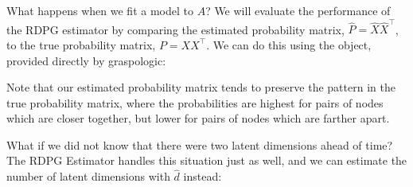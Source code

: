 \documentclass[letterpaper,10pt,english]{jupyterBook}
\begin{document}
\noindent{}

\sphinxAtStartPar
What happens when we fit a  model to \(A\)? We will evaluate the performance of the RDPG estimator by comparing the estimated probability matrix, \(\hat P = \hat X \hat X^\top\), to the true probability matrix, \(P = XX^\top\). We can do this using the  object, provided directly by graspologic:

\begin{sphinxVerbatim}[commandchars=\\\{\}]
   

     
  
    
\end{sphinxVerbatim}

\noindent{}

\sphinxAtStartPar
Note that our estimated probability matrix tends to preserve the pattern in the true probability matrix, where the probabilities are highest for pairs of nodes which are closer together, but lower for pairs of nodes which are farther apart.

\sphinxAtStartPar
What if we did not know that there were two latent dimensions ahead of time? The RDPG Estimator handles this situation just as well, and we can estimate the number of latent dimensions with \(\hat d\) instead:

\begin{sphinxVerbatim}[commandchars=\\\{\}]
    
  
    
  \PYG{p}{[}\PYG{p}{]}
\end{sphinxVerbatim}
\end{document}
